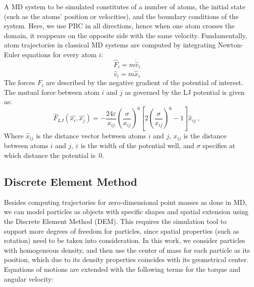 \documentclass[preprint,12pt]{elsarticle}
\begin{document}
A \ac{MD} system to be simulated constitutes of a number of atoms, the initial state (such as the atoms' position or velocities), and the boundary conditions of the system.
Here, we use \ac{PBC} in all directions, hence when one atom crosses the domain, it reappears on the opposite side with the same velocity.
Fundamentally, atom trajectories in classical \ac{MD} systems are computed by integrating Newton-Euler equations for every atom $i$:
\begin{equation}
    \hat F_i = m \dot{\hat v}_i \label{eq:newton_force}
\end{equation}
\begin{equation}
    \hat v_i = m \dot{\hat x}_i \label{eq:newton_velocity}
\end{equation}
The forces $F_i$ are described by the negative gradient of the potential of interest.
The mutual force between atom $i$ and $j$ as governed by the \ac{LJ} potential
is given as:
\begin{equation}
    \hat{F}_{LJ}(\hat{x_i}, \hat{x_j}) = -\frac{24\varepsilon}{x_{ij}} \left( \frac{\sigma}{x_{ij}} \right)^{6} \left[ 2\left(\frac{\sigma}{x_{ij}}\right)^{6} - 1\right] \hat{x}_{ij}~,
    \label{eq:lennard_jones}
\end{equation}
Where $\hat{x}_{ij}$ is the distance vector between atoms $i$ and $j$, $x_{ij}$ is the distance between atoms $i$ and $j$, $\varepsilon$ is the width of the potential well, and $\sigma$ specifies at which distance the potential is~$0$.

\subsection{Discrete Element Method}
\label{sec:dem}

Besides computing trajectories for zero-dimensional point masses as done in MD, we can model particles as objects with specific shapes and spatial extension using the Discrete Element Method (DEM).
This requires the simulation tool to support more degrees of freedom for particles, since spatial properties (such as rotation) need to be taken into consideration.
In this work, we consider particles with homogeneous density, and then use the center of mass for each particle as its position, which due to its density properties coincides with its geometrical center.
Equations of motions are extended with the following terms for the torque and angular velocity:
\end{document}
